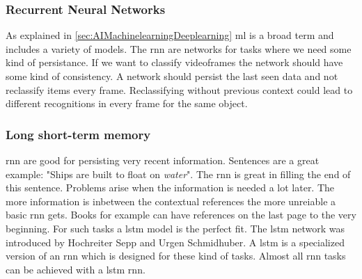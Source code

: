 \documentclass[10pt,a4paper]{article}
\begin{document}
\subsubsection{Recurrent Neural Networks}
As explained in \autoref{sec:AIMachinelearningDeeplearning} \gls{ml} is a broad term and includes a variety of models. The \gls{rnn} are networks for tasks where we need some kind of persistance. If we want to classify videoframes the network should have some kind of consistency\cite{Olah2015}. A network should persist the last seen data and not reclassify items every frame. Reclassifying without previous context could lead to different recognitions in every frame for the same object.

\subsubsection{Long short-term memory}
\gls{rnn} are good for persisting very recent information. Sentences are a great example: "Ships are built to float on \textit{water}". The \gls{rnn} is great in filling the end of this sentence. Problems arise when the information is needed a lot later. The more information is inbetween the contextual references the more unreiable a basic \gls{rnn} gets. Books for example can have references on the last page to the very beginning. For such tasks a \gls{lstm} model is the perfect fit. The \gls{lstm} network was introduced by Hochreiter Sepp and Urgen Schmidhuber\citep{Hochreiter1997}. A \gls{lstm} is a specialized version of an \gls{rnn} which is designed for these kind of tasks. Almost all \gls{rnn} tasks can be achieved with a \gls{lstm} \gls{rnn}\cite{Olah2015}.
\end{document}
